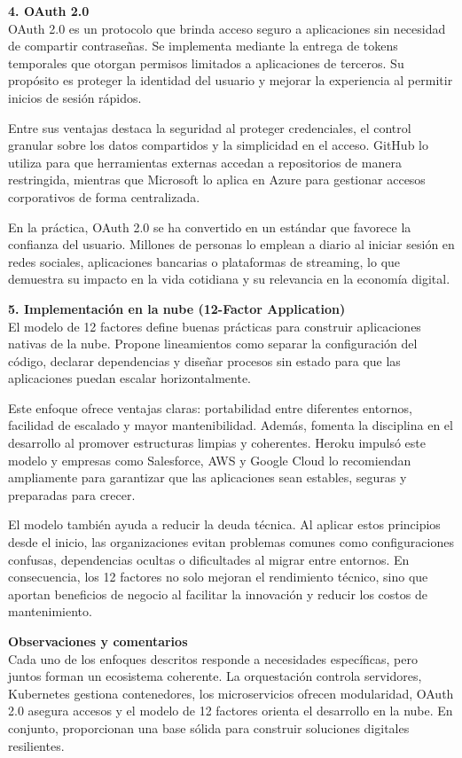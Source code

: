 \documentclass[12pt,letterpaper]{article}
\begin{document}
\textbf{4. OAuth 2.0}\\
OAuth 2.0 es un protocolo que brinda acceso seguro a aplicaciones sin necesidad de compartir contraseñas. Se implementa mediante la entrega de tokens temporales que otorgan permisos limitados a aplicaciones de terceros. Su propósito es proteger la identidad del usuario y mejorar la experiencia al permitir inicios de sesión rápidos.  

Entre sus ventajas destaca la seguridad al proteger credenciales, el control granular sobre los datos compartidos y la simplicidad en el acceso. GitHub lo utiliza para que herramientas externas accedan a repositorios de manera restringida, mientras que Microsoft lo aplica en Azure para gestionar accesos corporativos de forma centralizada.  

En la práctica, OAuth 2.0 se ha convertido en un estándar que favorece la confianza del usuario. Millones de personas lo emplean a diario al iniciar sesión en redes sociales, aplicaciones bancarias o plataformas de streaming, lo que demuestra su impacto en la vida cotidiana y su relevancia en la economía digital.

\textbf{5. Implementación en la nube (12-Factor Application)}\\
El modelo de 12 factores define buenas prácticas para construir aplicaciones nativas de la nube. Propone lineamientos como separar la configuración del código, declarar dependencias y diseñar procesos sin estado para que las aplicaciones puedan escalar horizontalmente.  

Este enfoque ofrece ventajas claras: portabilidad entre diferentes entornos, facilidad de escalado y mayor mantenibilidad. Además, fomenta la disciplina en el desarrollo al promover estructuras limpias y coherentes. Heroku impulsó este modelo y empresas como Salesforce, AWS y Google Cloud lo recomiendan ampliamente para garantizar que las aplicaciones sean estables, seguras y preparadas para crecer.  

El modelo también ayuda a reducir la deuda técnica. Al aplicar estos principios desde el inicio, las organizaciones evitan problemas comunes como configuraciones confusas, dependencias ocultas o dificultades al migrar entre entornos. En consecuencia, los 12 factores no solo mejoran el rendimiento técnico, sino que aportan beneficios de negocio al facilitar la innovación y reducir los costos de mantenimiento.

\textbf{Observaciones y comentarios}\\
Cada uno de los enfoques descritos responde a necesidades específicas, pero juntos forman un ecosistema coherente. La orquestación controla servidores, Kubernetes gestiona contenedores, los microservicios ofrecen modularidad, OAuth 2.0 asegura accesos y el modelo de 12 factores orienta el desarrollo en la nube. En conjunto, proporcionan una base sólida para construir soluciones digitales resilientes.  
\end{document}
